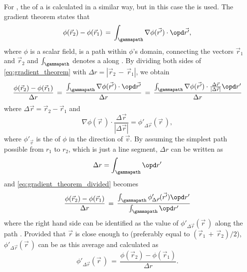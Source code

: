 For , the \gradient of a  is calculated in a similar way, but in this case the  is used. The gradient theorem states that
%
\begin{equation} \label{eq:gradient_theorem}
\phi(\vec{r}_2)-\phi(\vec{r}_1) \,=\, \int_\gammapath\nabla\phi(\vec{r'})\cdot \opd\vec{r'},
\end{equation}
%
where $\phi$ is a scalar field, \textgammapath is a path within $\phi$'s domain, connecting the vectors $\vec{r}_1$ and $\vec{r}_2$ and $\int_\gammapath$ denotes a  along \textgammapath. By dividing both sides of \eqref{eq:gradient_theorem} with \mbox{$\Delta r = |\vec{r}_2\,-\,\vec{r}_1|$}, we obtain
%
\begin{equation} \label{eq:gradient_theorem_divided}
\frac{\phi(\vec{r}_2)-\phi(\vec{r}_1)}{\Delta r} \,=\, \frac{\int_\gammapath\nabla\phi(\vec{r'})\cdot \opd\vec{r'}}{\Delta r} \,=\, \frac{\int_\gammapath\nabla\phi(\vec{r'})\cdot\frac{\Delta\vec{r}}{|\Delta\vec{r}|} \opd r'}{\Delta r}
\end{equation}
%
where $\Delta\vec{r} = \vec{r}_2 -  \vec{r}_1$ and
%
\begin{equation}
\nabla\phi(\vec{r}\,)\cdot\frac{\Delta\vec{r}}{|\Delta\vec{r}|} = \phi'_{\Delta\vec{r}}(\vec{r}\,),
\end{equation}
%
where $\phi'_{\vec{v}}$ is the \derivative of $\phi$ in the direction of $\vec{v}$. By assuming the simplest path possible from $r_1$ to $r_2$, which is just a line segment, $\Delta r$ can be written as
%
\begin{equation}
\Delta r = \int_\gammapath\opd r'
\end{equation}
%
and \eqref{eq:gradient_theorem_divided} becomes
%
\begin{equation} \label{eq:phi_derivative_integral}
\frac{\phi(\vec{r}_2)-\phi(\vec{r}_1)}{\Delta r} \,=\, \frac{\int_\gammapath\phi'_{\Delta\vec{r}}(\vec{r'})\opd r'}{\int_\gammapath\opd r'}
\end{equation}
%
where the right hand side can be identified as the \average value of $\phi'_{\Delta\vec{r}}(\vec{r}\,)$ along the path \textgammapath. Provided that $\vec{r}$ is close enough to \textgammapath (preferably equal to \mbox{$(\vec{r}_1\,+\,\vec{r}_2)/2$}), $\phi'_{\Delta\vec{r}}(\vec{r}\,)$ can be \approximated as this average and calculated as
%
\begin{equation} \label{eq:phi_derivative_final}
\phi'_{\Delta\vec{r}}(\vec{r}\,) \,=\, \frac{\phi(\vec{r}_2)-\phi(\vec{r}_1)}{\Delta r}.
\end{equation}

